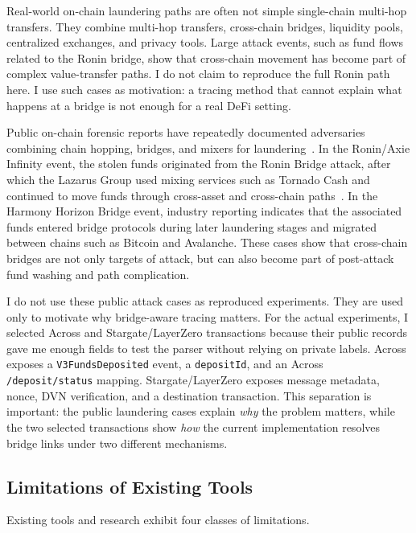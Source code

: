 \documentclass[12pt,a4paper]{article}
\begin{document}
Real-world on-chain laundering paths are often not simple single-chain multi-hop transfers. They combine multi-hop transfers, cross-chain bridges, liquidity pools, centralized exchanges, and privacy tools. Large attack events, such as fund flows related to the Ronin bridge, show that cross-chain movement has become part of complex value-transfer paths. I do not claim to reproduce the full Ronin path here. I use such cases as motivation: a tracing method that cannot explain what happens at a bridge is not enough for a real DeFi setting.

Public on-chain forensic reports have repeatedly documented adversaries combining chain hopping, bridges, and mixers for laundering~\cite{chainalysis2024,elliptic2023}. In the Ronin/Axie Infinity event, the stolen funds originated from the Ronin Bridge attack, after which the Lazarus Group used mixing services such as Tornado Cash and continued to move funds through cross-asset and cross-chain paths~\cite{chainalysisRonin2022,chainalysisTornado2022}. In the Harmony Horizon Bridge event, industry reporting indicates that the associated funds entered bridge protocols during later laundering stages and migrated between chains such as Bitcoin and Avalanche. These cases show that cross-chain bridges are not only targets of attack, but can also become part of post-attack fund washing and path complication.

I do not use these public attack cases as reproduced experiments. They are used only to motivate why bridge-aware tracing matters. For the actual experiments, I selected Across and Stargate/LayerZero transactions because their public records gave me enough fields to test the parser without relying on private labels. Across exposes a \texttt{V3FundsDeposited} event, a \texttt{depositId}, and an Across \texttt{/deposit/status} mapping. Stargate/LayerZero exposes message metadata, nonce, DVN verification, and a destination transaction. This separation is important: the public laundering cases explain \textit{why} the problem matters, while the two selected transactions show \textit{how} the current implementation resolves bridge links under two different mechanisms.

\subsection{Limitations of Existing Tools}

Existing tools and research exhibit four classes of limitations.
\end{document}
